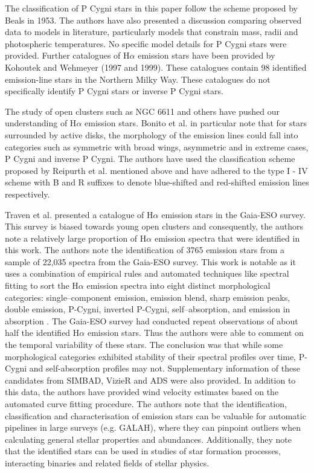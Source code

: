 The classification of P Cygni stars in this paper follow the scheme proposed by Beals in 1953\cite{1953PDAO....9....1B}. The authors have also presented a discussion comparing observed data to models in literature, particularly models that constrain mass, radii and photospheric temperatures. No specific model details for P Cygni stars were provided. Further catalogues of H$\alpha$ emission stars have been provided by Kohoutek and Wehmeyer (1997 and 1999). These catalogues contain 98 identified emission-line stars in the Northern Milky Way. These catalogues do not specifically identify P Cygni stars or inverse P Cygni stars\cite{kohoutek1999catalogue}.

The study of open clusters such as NGC 6611 and others have pushed our understanding of H$\alpha$ emission stars\cite{traven2015gaia}. Bonito et al. in particular\cite{bonito2013spectroscopic} note that for stars surrounded by active disks, the morphology of the emission lines could fall into categories such as symmetric with broad wings, asymmetric and in extreme cases, P Cygni and inverse P Cygni. The authors have used the classification scheme proposed by Reipurth et al. mentioned above and have adhered to the type I - IV scheme with B and R suffixes to denote blue-shifted and red-shifted emission lines respectively. 

Traven et al. presented a catalogue of H$\alpha$ emission stars in the Gaia-ESO survey. This survey is biased towards young open clusters and consequently, the authors note a relatively large proportion of H$\alpha$ emission spectra that were identified in this work. The authors note the identification of 3765 emission stars from a sample of 22,035 spectra from the Gaia-ESO survey. This work is notable as it uses a combination of empirical rules and automated techniques like spectral fitting to sort the H$\alpha$ emission spectra into eight distinct morphological categories: single–component emission, emission blend, sharp emission peaks, double emission, P-Cygni, inverted P-Cygni, self–absorption, and emission in absorption \cite{traven2015gaia}. The Gaia-ESO survey had conducted repeat observations of about half the identified H$\alpha$ emission stars. Thus the authors were able to comment on the temporal variability of these stars. The conclusion was that while some morphological categories exhibited stability of their spectral profiles over time, P-Cygni and self-absorption profiles may not. Supplementary information of these candidates from SIMBAD, VizieR and ADS were also provided. In addition to this data, the authors have provided wind velocity estimates based on the automated curve fitting procedure. The authors note that the identification, classification and characterisation of emission stars can be valuable for automatic pipelines in large surveys (e.g. GALAH), where they can pinpoint outliers when calculating general stellar properties and abundances. Additionally, they note that the identified stars can be used in studies of star formation processes, interacting binaries and related fields of stellar physics. 

